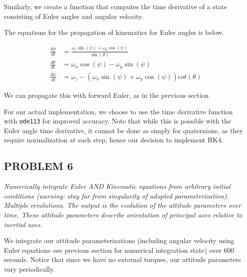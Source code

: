 Similarly, we create a function that computes the time derivative of a state consisting of Euler angles and angular velocity.

The equations for the propagation of kinematics for Euler angles is below.

\begin{align*}
\frac{d \phi}{dt} &= \frac{\omega_{x} \sin(\psi) + \omega_{y} \cos(\psi)}{\sin(\theta)}\\
\frac{d \theta}{dt} &= \omega_{x} \cos(\psi) - \omega_{y} \sin(\psi)\\
\frac{d \psi}{dt} &= \omega_{z} - (\omega_{x} \sin(\psi) + \omega_{y} \cos(\psi)) cot(\theta)
\end{align*}



We can propagate this with forward Euler, as in the previous section.



For our actual implementation, we choose to use the time derivative function with \texttt{ode113} for improved accuracy. Note that while this is possible with the Euler angle time derivative, it cannot be done as simply for quaternions, as they require normalization at each step, hence our decision to implement RK4.


\subsection{PROBLEM 6}
\textit{Numerically integrate Euler AND Kinematic equations from arbitrary initial conditions (warning: stay far from singularity of adopted parameterization). Multiple revolutions. The output is the evolution of the attitude parameters over time. These attitude parameters describe orientation of principal axes relative to inertial axes.}

We integrate our attitude parameterizations (including angular velocity using Euler equations–see previous section for numerical integration state) over 600 seconds. Notice that since we have no external torques, our attitude parameters vary periodically.

